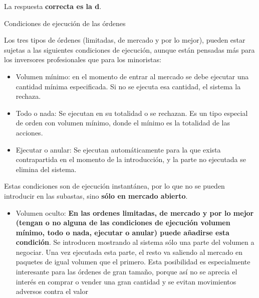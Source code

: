 \documentclass[
  letterpaper,
  DIV=11,
  numbers=noendperiod]{scrreprt}
\providecommand{\tightlist}{%
  \setlength{\itemsep}{0pt}\setlength{\parskip}{0pt}}\usepackage{longtable,booktabs,array}
\begin{document}
\begin{tcolorbox}[enhanced jigsaw, left=2mm, opacityback=0, colback=white, breakable, arc=.35mm, bottomrule=.15mm, rightrule=.15mm, toprule=.15mm, leftrule=.75mm, colframe=quarto-callout-tip-color-frame]
\begin{minipage}[t]{5.5mm}
\textcolor{quarto-callout-tip-color}{\faLightbulb}
\end{minipage}%
\begin{minipage}[t]{\textwidth - 5.5mm}

La respuesta \textbf{correcta es la d}.

Condiciones de ejecución de las órdenes

Los tres tipos de órdenes (limitadas, de mercado y por lo mejor), pueden
estar sujetas a las siguientes condiciones de ejecución, aunque están
pensadas más para los inversores profesionales que para los minoristas:

\begin{itemize}
\item
  Volumen mínimo: en el momento de entrar al mercado se debe ejecutar
  una cantidad mínima especificada. Si no se ejecuta esa cantidad, el
  sistema la rechaza.
\item
  Todo o nada: Se ejecutan en su totalidad o se rechazan. Es un tipo
  especial de orden con volumen mínimo, donde el mínimo es la totalidad
  de las acciones.
\item
  Ejecutar o anular: Se ejecutan automáticamente para la que exista
  contrapartida en el momento de la introducción, y la parte no
  ejecutada se elimina del sistema.
\end{itemize}

Estas condiciones son de ejecución instantánea, por lo que no se pueden
introducir en las subastas, sino \textbf{sólo en mercado abierto}.

\begin{itemize}
\tightlist
\item
  Volumen oculto: \textbf{En las ordenes limitadas, de mercado y por lo
  mejor (tengan o no alguna de las condiciones de ejecución volumen
  mínimo, todo o nada, ejecutar o anular) puede añadirse esta
  condición}. Se introducen mostrando al sistema sólo una parte del
  volumen a negociar. Una vez ejecutada esta parte, el resto va saliendo
  al mercado en paquetes de igual volumen que el primero. Esta
  posibilidad es especialmente interesante para las órdenes de gran
  tamaño, porque así no se aprecia el interés en comprar o vender una
  gran cantidad y se evitan movimientos adversos contra el valor
\end{itemize}

\end{minipage}%
\end{tcolorbox}
\end{document}
